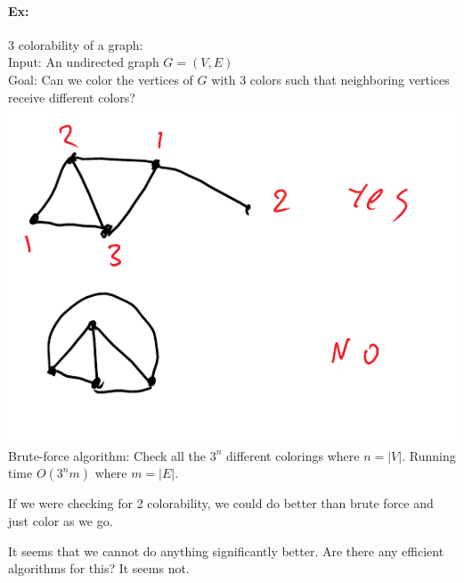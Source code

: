 \documentclass[12 pt]{article}
\begin{document}
          \paragraph{Ex:} 3 colorability of a graph:
          \\ Input: An undirected graph $G=(V,E)$
          \\ Goal: Can we color the vertices of $G$ with 3 colors such
          that neighboring vertices receive different colors?
          \\ \includegraphics[width=.9\textwidth]{i113.pdf}
          \\ Brute-force algorithm: Check all the $3^n$ different
          colorings where $n=\left|V\right|$. Running time $O(3^nm)$
          where $m = \left|E\right|$.

          If we were checking for 2 colorability, we could do better
          than brute force and just color as we go.

          It seems that we cannot do anything significantly
          better. Are there any efficient algorithms for this? It
          seems not.
\end{document}
